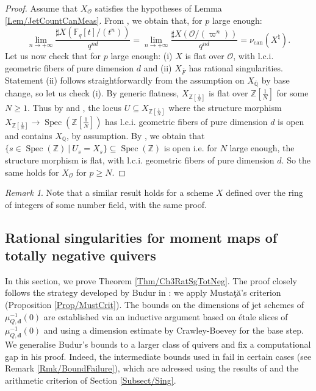 \documentclass[11pt,english]{article}
\numberwithin{equation}{section}
\numberwithin{figure}{section}
\theoremstyle{definition}
\theoremstyle{plain}
\theoremstyle{remark}
\newtheorem{rmk}[df]{Remark}
\DeclareMathOperator{\Spec}{Spec}
\newcommand\dd{\mathbf{d}}
\begin{document}
\begin{proof}

Assume that $X_{\mathcal{O}}$ satisfies the hypotheses of Lemma \ref{Lem/JetCountCanMeas}.
From \cite[Prop. 3.0.2.]{AA18}, we obtain that, for $p$ large enough:\[
\underset{n\rightarrow +\infty}{\lim}\frac{\sharp X(\mathbb{F}_{q}[t]/(t^{n}))}{q^{nd}}
=
\underset{n\rightarrow +\infty}{\lim}\frac{\sharp X(\mathcal{O}/(\varpi^{n}))}{q^{nd}}
=
\nu_{\mathrm{can}}(X^{\natural}).
\]Let us now check that for $p$ large enough: (i) $X$ is flat over
$\mathcal{O}$, with l.c.i. geometric fibers of pure dimension $d$
and (ii) $X_{\overline{F}}$ has rational singularities. Statement
(ii) follows straightforwardly from the assumption on $X_{\overline{\mathbb{Q}}}$
by base change, so let us check (i). By generic flatness, $X_{\mathbb{Z}[\frac{1}{N}]}$
is flat over $\mathbb{Z}[\frac{1}{N}]$ for some $N\geq1$. Thus by
\cite[\href{https://stacks.math.columbia.edu/tag/01UE}{Tag 01UE}, \href{https://stacks.math.columbia.edu/tag/01UF}{Tag 01UF}]{SP}
and \cite[Thm. 13.1.3.]{Gro66}, the locus $U\subseteq X_{\mathbb{Z}[\frac{1}{N}]}$
where the structure morphism $X_{\mathbb{Z}[\frac{1}{N}]}\rightarrow\Spec(\mathbb{Z}[\frac{1}{N}])$
has l.c.i. geometric fibers of pure dimension $d$ is open and contains
$X_{\mathbb{Q}}$, by assumption. By \cite[Cor. 9.5.2.]{Gro66}, we
obtain that $\{s\in\Spec(\mathbb{Z})\ \vert\ U_{s}=X_{s}\}\subseteq\Spec(\mathbb{Z})$
is open i.e. for $N$ large enough, the structure morphism is flat,
with l.c.i. geometric fibers of pure dimension $d$. So the same holds
for $X_{\mathcal{O}}$ for $p\geq N$. \end{proof}

\begin{rmk}

Note that a similar result holds for a scheme $X$ defined over the
ring of integers of some number field, with the same proof.

\end{rmk}

\subsection{Rational singularities for moment maps of totally negative quivers
\label{Subsect/RatSgTotNegQuiv}}

In this section, we prove Theorem \ref{Thm/Ch3RatSgTotNeg}. The proof
closely follows the strategy developed by Budur in \cite{Bud21}:
we apply Musta\c{t}\u{a}'s criterion (Proposition \ref{Prop/MustCrit}).
The bounds on the dimensions of jet schemes of $\mu_{Q,\dd}^{-1}(0)$
are established via an inductive argument based on étale slices of
$\mu_{Q,\dd}^{-1}(0)$ and using a dimension estimate by Crawley-Boevey
for the base step. We generalise Budur's bounds to a larger class
of quivers and fix a computational gap in his proof. Indeed, the intermediate
bounds used in \cite{Bud21} fail in certain cases (see Remark \ref{Rmk/BoundFailure}),
which are adressed using the results of \cite{Wys17b} and the arithmetic
criterion of Section \ref{Subsect/Sing}.
\end{document}
